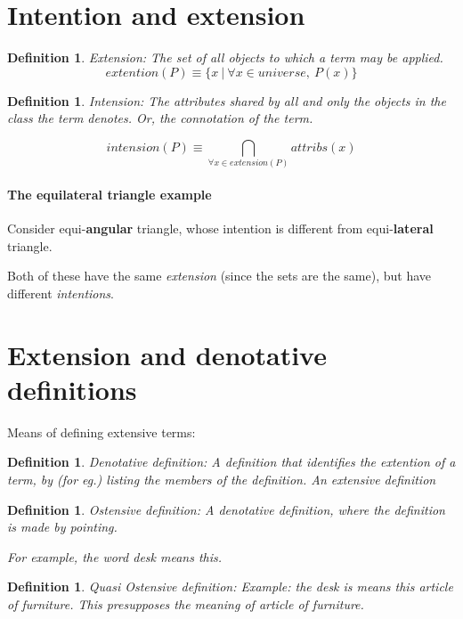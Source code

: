 \documentclass[5pt]{book}
\newtheorem{definition}[theorem]{Definition}
\begin{document}
\section{Intention and extension}
\begin{definition} Extension: The set of all objects to which a term
    may be applied. $$extention(P) \equiv \{ x ~|~\forall x \in universe, ~P(x) \}$$
\end{definition}

\begin{definition} Intension: The attributes shared by all and only the objects
    in the class the term denotes. Or, the connotation of the term.

    $$intension(P) \equiv \bigcap_{\forall x \in extension(P)} attribs(x) $$
\end{definition}

\paragraph{The equilateral triangle example} 
Consider equi-\textbf{angular} triangle,
whose intention is different from equi-\textbf{lateral} triangle.

Both of these have the same \textit{extension} (since the sets are the
same), but have different \textit{intentions}.

\section{Extension and denotative definitions}
Means of defining extensive terms:
\begin{definition}Denotative definition: A definition that identifies
    the extention of a term, by (for eg.) listing the members
    of the definition. An extensive definition
\end{definition}


\begin{definition}Ostensive definition: A denotative definition, where
    the definition is made by pointing.

    For example, the word desk means \textit{this}.
\end{definition}

\begin{definition}Quasi Ostensive definition:
    Example: the desk is means \textit{this} article of furniture. This
    presupposes the meaning of \textit{article of furniture}.
\end{definition}
\end{document}
